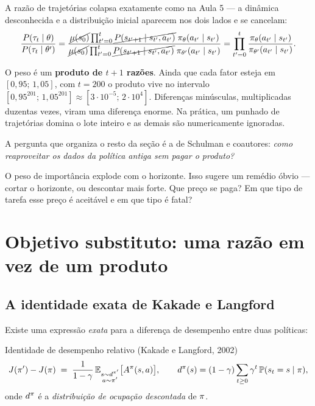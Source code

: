 \documentclass[11pt]{article}
\newcommand{\thv}{\theta}
\newcommand{\polth}{\pol_{\thv}}
\newcommand{\polnovo}{\pol'}
\newcommand{\traj}{\tau}
\newcommand{\Advpi}{A^{\pol}}
\newcommand{\dpi}{d^{\pol}}
\begin{document}
A razão de trajetórias colapsa exatamente como na Aula 5 --- a dinâmica desconhecida
e a distribuição inicial aparecem nos dois lados e se cancelam:
\[
  \frac{P(\traj_t\mid\thv)}{P(\traj_t\mid\thv')}
   = \frac{\cancel{\mu(s_0)}\prod_{t'=0}^{t}\cancel{P(s_{t'+1}\mid s_{t'},a_{t'})}\;\polth(a_{t'}\mid s_{t'})}
          {\cancel{\mu(s_0)}\prod_{t'=0}^{t}\cancel{P(s_{t'+1}\mid s_{t'},a_{t'})}\;\pol_{\thv'}(a_{t'}\mid s_{t'})}
   = \prod_{t'=0}^{t}\frac{\polth(a_{t'}\mid s_{t'})}{\pol_{\thv'}(a_{t'}\mid s_{t'})} .
\]

\begin{alertabox}
  O peso é um \textbf{produto de $t+1$ razões}. Ainda que cada fator esteja em
  $[0{,}95;\,1{,}05]$, com $t = 200$ o produto vive no intervalo
  $[0{,}95^{201};\,1{,}05^{201}] \approx [3\cdot10^{-5};\,2\cdot10^{4}]$. Diferenças
  minúsculas, multiplicadas duzentas vezes, viram uma diferença enorme. Na prática, um
  punhado de trajetórias domina o lote inteiro e as demais são numericamente ignoradas.
\end{alertabox}

A pergunta que organiza o resto da seção é a de Schulman e coautores: \emph{como
reaproveitar os dados da política antiga sem pagar o produto?}

\begin{discbox}
  O peso de importância explode com o horizonte. Isso sugere um remédio óbvio --- cortar
  o horizonte, ou descontar mais forte. Que preço se paga? Em que tipo de tarefa esse
  preço é aceitável e em que tipo é fatal?
\end{discbox}

\section{Objetivo substituto: uma razão em vez de um produto}

\subsection{A identidade exata de Kakade e Langford}

Existe uma expressão \emph{exata} para a diferença de desempenho entre duas políticas:

\begin{teobox}{Identidade de desempenho relativo (Kakade e Langford, 2002)}
  \[
    J(\polnovo) - J(\pol) \;=\; \frac{1}{1-\gamma}\,
      \E_{\substack{s\sim d^{\polnovo}\\ a\sim\polnovo}}\bigl[\Advpi(s,a)\bigr],
    \qquad
    \dpi(s) = (1-\gamma)\sum_{t\ge0}\gamma^t\,\Prob(s_t=s\mid\pol),
  \]
  onde $\dpi$ é a \emph{distribuição de ocupação descontada} de $\pi$.
\end{teobox}
\end{document}
